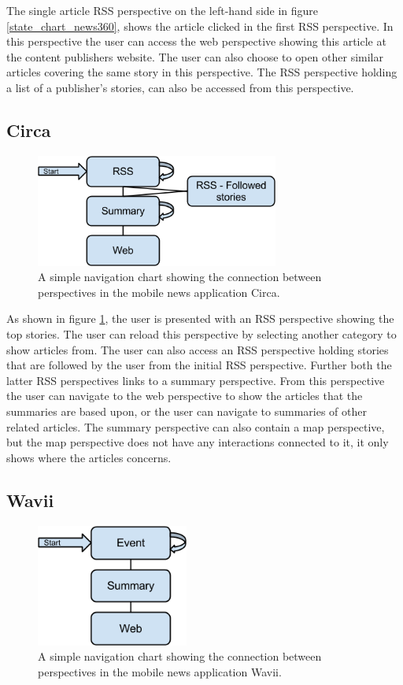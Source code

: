 The single article RSS perspective on the left-hand side in figure \ref{state_chart_news360}, shows the article clicked in the first RSS perspective. In this perspective the user can access the web perspective showing this article at the content publishers website. The user can also choose to open other similar articles covering the same story in this perspective. The RSS perspective holding a list of a publisher's stories, can also be accessed from this perspective.

\subsection{Circa}

\begin{figure}[!htbp]
\centering
\includegraphics[width=80mm]{GFX/statecharts/Circa.png}
\caption{A simple navigation chart showing the connection between perspectives in the mobile news application Circa.}
\label{state_chart_circa}
\end{figure}

As shown in figure \ref{state_chart_circa}, the user is presented with an RSS perspective showing the top stories. The user can reload this perspective by selecting another category to show articles from. The user can also access an RSS perspective holding stories that are followed by the user from the initial RSS perspective. Further both the latter RSS perspectives links to a summary perspective. From this perspective the user can navigate to the web perspective to show the articles that the summaries are based upon, or the user can navigate to summaries of other related articles. The summary perspective can also contain a map perspective, but the map perspective does not have any interactions connected to it, it only shows where the articles concerns.

\subsection{Wavii}

\begin{figure}[!htbp]
\centering
\includegraphics[width=50mm]{GFX/statecharts/Wavii.png}
\caption{A simple navigation chart showing the connection between perspectives in the mobile news application Wavii.}
\label{state_chart_wavii}
\end{figure}


